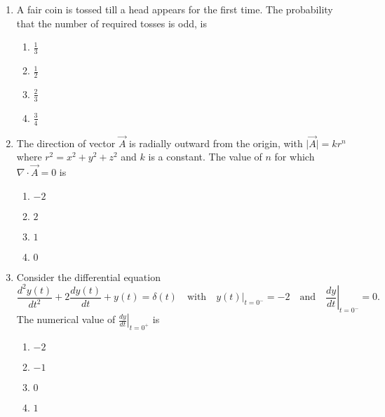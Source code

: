 \documentclass[journal]{IEEEtran}
\begin{document}
\begin{enumerate}
    \item A fair coin is tossed till a head appears for the first time. The probability that the number of required tosses is odd, is

    \begin{multicols}{4}
        \begin{enumerate}
            \item $\frac{1}{3}$
            \item $\frac{1}{2}$
            \item $\frac{2}{3}$
            \item $\frac{3}{4}$
        \end{enumerate}
    \end{multicols}

    \item The direction of vector $\vec{A}$ is radially outward from the origin, with $\lvert \vec{A} \rvert = kr^n$ where $r^2 = x^2 + y^2 + z^2$ and $k$ is a constant. The value of $n$ for which $\nabla \cdot \vec{A} = 0$ is

    \begin{multicols}{4}
        \begin{enumerate}
            \item $-2$
            \item $2$
            \item $1$
            \item $0$
        \end{enumerate}
    \end{multicols}

    \item Consider the differential equation
    $$ \frac{d^2 y(t)}{dt^2} + 2 \frac{dy(t)}{dt} + y(t) = \delta(t) \quad \text{with} \left. \quad y(t) \right|_{t=0^{-}} = -2 \quad \text{and} \quad \left. \frac{dy}{dt} \right|_{t=0^{-}} = 0. $$
    The numerical value of $\left. \frac{dy}{dt} \right|_{t=0^{+}}$ is

    \begin{multicols}{4}
        \begin{enumerate}
            \item $-2$
            \item $-1$
            \item $0$
            \item $1$
        \end{enumerate}
    \end{multicols}

\end{enumerate}
\end{document}
